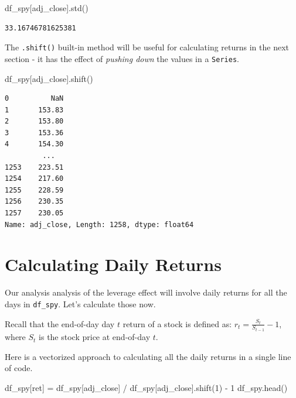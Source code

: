\documentclass[
  letterpaper,
  DIV=11,
  numbers=noendperiod]{scrreprt}
\newenvironment{Shaded}{\begin{snugshade}}{\end{snugshade}}
\newcommand{\DecValTok}[1]{\textcolor[rgb]{0.68,0.00,0.00}{#1}}
\newcommand{\NormalTok}[1]{\textcolor[rgb]{0.00,0.23,0.31}{#1}}
\newcommand{\OperatorTok}[1]{\textcolor[rgb]{0.37,0.37,0.37}{#1}}
\newcommand{\StringTok}[1]{\textcolor[rgb]{0.13,0.47,0.30}{#1}}
\begin{document}
\begin{Shaded}
\begin{Highlighting}[]
\NormalTok{df\_spy[}\StringTok{\textquotesingle{}adj\_close\textquotesingle{}}\NormalTok{].std()}
\end{Highlighting}
\end{Shaded}

\begin{verbatim}
33.16746781625381
\end{verbatim}

The \texttt{.shift()} built-in method will be useful for calculating
returns in the next section - it has the effect of \emph{pushing down}
the values in a \texttt{Series}.

\begin{Shaded}
\begin{Highlighting}[]
\NormalTok{df\_spy[}\StringTok{\textquotesingle{}adj\_close\textquotesingle{}}\NormalTok{].shift()}
\end{Highlighting}
\end{Shaded}

\begin{verbatim}
0          NaN
1       153.83
2       153.80
3       153.36
4       154.30
         ...  
1253    223.51
1254    217.60
1255    228.59
1256    230.35
1257    230.05
Name: adj_close, Length: 1258, dtype: float64
\end{verbatim}

\hypertarget{calculating-daily-returns}{%
\section{Calculating Daily Returns}\label{calculating-daily-returns}}

Our analysis analysis of the leverage effect will involve daily returns
for all the days in \texttt{df\_spy}. Let's calculate those now.

Recall that the end-of-day day \(t\) return of a stock is defined as:
\(r_{t} = \frac{S_{t}}{S_{t-1}} - 1\), where \(S_{t}\) is the stock
price at end-of-day \(t\).

Here is a vectorized approach to calculating all the daily returns in a
single line of code.

\begin{Shaded}
\begin{Highlighting}[]
\NormalTok{df\_spy[}\StringTok{\textquotesingle{}ret\textquotesingle{}}\NormalTok{] }\OperatorTok{=}\NormalTok{ df\_spy[}\StringTok{\textquotesingle{}adj\_close\textquotesingle{}}\NormalTok{] }\OperatorTok{/}\NormalTok{ df\_spy[}\StringTok{\textquotesingle{}adj\_close\textquotesingle{}}\NormalTok{].shift(}\DecValTok{1}\NormalTok{) }\OperatorTok{{-}} \DecValTok{1}
\NormalTok{df\_spy.head()}
\end{Highlighting}
\end{Shaded}
\end{document}
